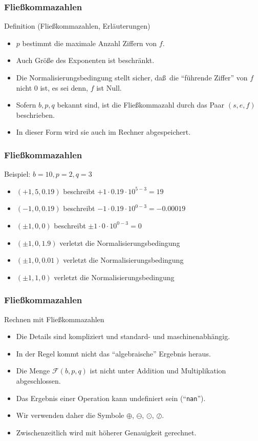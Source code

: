 \documentclass{beamer}
\newcommand\nan{{\tt nan}}
\newcommand\cF{\mathcal F}
\renewcommand{\ae}{\"a}
\renewcommand{\oe}{\"o}
\newcommand{\mytitle}{Flie\ss kommazahlen}
\begin{document}
\begin{frame}\frametitle{\mytitle}
	\begin{block}{Definition (Flie\ss kommazahlen, Erl\ae uterungen)}
	\begin{itemize}
	\item $p$ bestimmt die maximale Anzahl Ziffern von $f$.
		\item Auch Gr\"o\ss e des Exponenten ist beschr\"ankt.
		\item Die Normalisierungsbedingung stellt sicher, da\ss\ die ``f\"uhrende Ziffer'' von $f$ nicht $0$ ist, es sei denn, $f$ ist Null.
		\item Sofern $b,p,q$ bekannt sind, ist die Flie\ss kommazahl durch das Paar $(s,e,f)$ beschrieben.
		\item In dieser Form wird sie auch im Rechner abgespeichert.
	\end{itemize}
	\end{block}
\end{frame}

\begin{frame}\frametitle{\mytitle}
	\begin{block}{Beispiel: $b=10,p=2,q=3$}
	\begin{itemize}
		\item $(+1,5,0.19)$ beschreibt $+1\cdot0.19\cdot10^{5-3}=19$
		\item $(-1,0,0.19)$ beschreibt $-1\cdot0.19\cdot10^{0-3}=-0.00019$
		\item $(\pm1,0,0)$ beschreibt $\pm1\cdot0\cdot10^{0-3}=0$
		\item $(\pm1,0,1.9)$ verletzt die Normalisierungsbedingung
		\item $(\pm1,0,0.01)$ verletzt die Normalisierungsbedingung
		\item $(\pm1,1,0)$ verletzt die Normalisierungsbedingung
	\end{itemize}
	\end{block}
\end{frame}

\begin{frame}\frametitle{\mytitle}
	\begin{block}{Rechnen mit Flie\ss kommazahlen}
		\begin{itemize}
			\item Die Details sind kompliziert und standard- und maschinenabh\"angig.
			\item In der Regel kommt \alert{nicht} das ``algebraische'' Ergebnis heraus.
			\item Die Menge $\cF(b,p,q)$ ist \alert{nicht} unter Addition und Multiplikation abgeschlossen.
			\item Das Ergebnis einer Operation kann undefiniert sein (``\nan'').
			\item Wir verwenden daher die Symbole $\oplus$, $\ominus$, $\odot$, $\oslash$.
			\item Zwischenzeitlich wird mit h\oe herer Genauigkeit gerechnet.
		\end{itemize}
	\end{block}
\end{frame}
\end{document}
